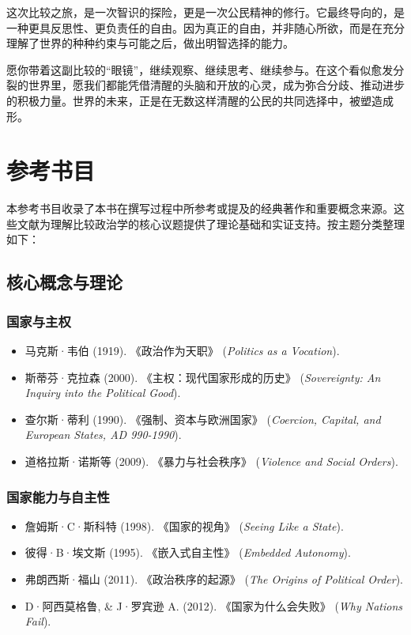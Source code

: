 \documentclass[a5paper, 11pt, openany]{ctexbook}
\begin{document}
这次比较之旅，是一次智识的探险，更是一次公民精神的修行。它最终导向的，是一种更具反思性、更负责任的自由。因为真正的自由，并非随心所欲，而是在充分理解了世界的种种约束与可能之后，做出明智选择的能力。

愿你带着这副比较的“眼镜”，继续观察、继续思考、继续参与。在这个看似愈发分裂的世界里，愿我们都能凭借清醒的头脑和开放的心灵，成为弥合分歧、推动进步的积极力量。世界的未来，正是在无数这样清醒的公民的共同选择中，被塑造成形。

\appendix
\chapter{参考书目}

本参考书目收录了本书在撰写过程中所参考或提及的经典著作和重要概念来源。这些文献为理解比较政治学的核心议题提供了理论基础和实证支持。按主题分类整理如下：

\section*{核心概念与理论}

\subsection*{国家与主权}
\begin{itemize}
    \item 马克斯·韦伯 (1919). 《政治作为天职》 (\textit{Politics as a Vocation}).
    \item 斯蒂芬·克拉森 (2000). 《主权：现代国家形成的历史》 (\textit{Sovereignty: An Inquiry into the Political Good}).
    \item 查尔斯·蒂利 (1990). 《强制、资本与欧洲国家》 (\textit{Coercion, Capital, and European States, AD 990-1990}).
    \item 道格拉斯·诺斯等 (2009). 《暴力与社会秩序》 (\textit{Violence and Social Orders}).
\end{itemize}

\subsection*{国家能力与自主性}
\begin{itemize}
    \item 詹姆斯·C·斯科特 (1998). 《国家的视角》 (\textit{Seeing Like a State}).
    \item 彼得·B·埃文斯 (1995). 《嵌入式自主性》 (\textit{Embedded Autonomy}).
    \item 弗朗西斯·福山 (2011). 《政治秩序的起源》 (\textit{The Origins of Political Order}).
    \item D·阿西莫格鲁, \& J·罗宾逊 A. (2012). 《国家为什么会失败》 (\textit{Why Nations Fail}).
\end{itemize}
\end{document}
